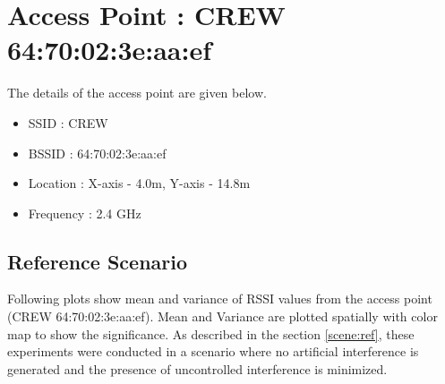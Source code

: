 \documentclass[11pt,a4paper,headinclude,footinclude,chapterprefix=on]{scrreprt}
\begin{document}
\begin{longtable}
\end{longtable}
\section{Access Point : CREW 64:70:02:3e:aa:ef} 
The details of the access point are given below.
\begin{itemize}
	\item SSID : CREW 
	\item BSSID : 64:70:02:3e:aa:ef 
	\item Location : X-axis - 4.0m, Y-axis - 14.8m 
	\item Frequency : 2.4 GHz 
\end{itemize}
\subsection{Reference Scenario} 
Following plots show mean and variance of RSSI values from the access point (CREW 64:70:02:3e:aa:ef). Mean and Variance are plotted spatially with color map to show the significance. As described in the section \ref{scene:ref}, these experiments were conducted in a scenario where no artificial interference is generated and the presence of uncontrolled interference is minimized.
\end{document}
